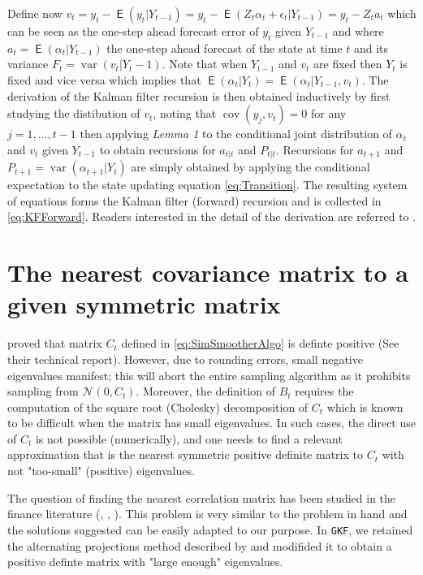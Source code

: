 \documentclass{article}
\newcommand{\GKF}{\texttt{GKF}\xspace}
\DeclareMathOperator{\var}{var}
\DeclareMathOperator{\cov}{cov}
\DeclareMathOperator{\E}{\mathsf{E}}
\begin{document}
Define now
$v_t = y_t - \E(y_t|Y_{t-1}) = y_t - \E(Z_t \alpha_t +\epsilon_t|Y_{t-1})= y_t - Z_ta_t$
which can be seen as the one-step ahead forecast error of $y_t$ given $Y_{t-1}$ and where
$ a_t= \E (\alpha_t | Y_{t-1})$ the one-step ahead forecast of the state at time $t$ and its
variance $F_t=\var(v_t | Y_t-1)$. Note that when $Y_{t-1}$ and $v_t$ are fixed then $Y_t$ is
fixed and vice versa which implies that $\E(\alpha_t | Y_t) = \E (\alpha_t|Y_{t-1},v_t)$. The
derivation of the Kalman filter recursion is then obtained inductively by first studying the
distibution of $v_t$, noting that $\cov(y_j,v_t)=0 $ for any $j=1,\dots,t-1$ then applying
\textit{Lemma 1} to the conditional joint distribution of $\alpha_t$ and $v_t$ given
$Y_{t-1}$ to obtain recursions for $a_{t|t}$ and $P_{t|t}$. Recursions for $a_{t+1}$ and
$P_{t+1}=\var(\alpha_{t+1}|Y_t)$ are simply obtained by applying the conditional expectation
to the state updating equation \eqref{eq:Transition}. The resulting system of equations forms
the Kalman filter (forward) recursion and is collected in \eqref{eq:KFForward}. Readers
interested in the detail of the derivation are referred to \citet[chap. 4]{durbin2012time}.

\section{The nearest covariance matrix to a given symmetric matrix}
\label{App:Nearest}

\citet{jungbacker2007monte} proved that matrix $C_t$ defined in \eqref{eq:SimSmootherAlgo} is
definte positive (See their technical report). However, due to rounding errors, small
negative eigenvalues manifest; this will abort the entire sampling algorithm as it prohibits
sampling from $\mathcal{N}(0,C_t)$. Moreover, the definition of $B_t$ requires the
computation of the square root (Cholesky) decomposition of $C_t$ which is known to be
difficult when the matrix has small eigenvalues. In such cases, the direct use of $C_t$ is
not possible (numerically), and one needs to find a relevant approximation that is the
nearest symmetric positive definite matrix to $C_t$ with not "too-small" (positive)
eigenvalues.

The question of finding the nearest correlation matrix has been studied in the finance
literature (\citet{higham2002computing}, \citet{li2011sequential},
\citet{borsdorf2010preconditioned}). This problem is very similar to the problem in hand and
the solutions suggested can be easily adapted to our purpose. In \GKF, we retained the
alternating projections method described by \citet{higham2002computing} and modifided it to
obtain a positive definte matrix with "large enough" eigenvalues.
\end{document}
